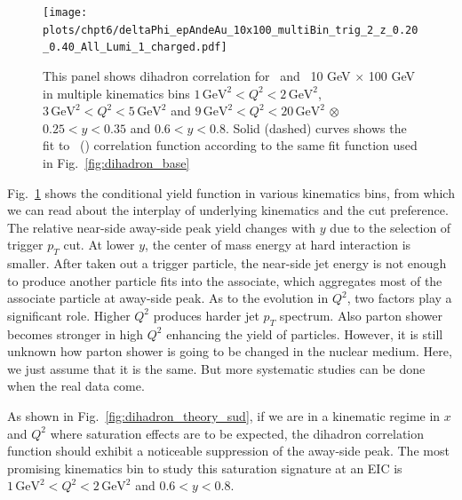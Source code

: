 \begin{figure}
\begin{center}
\texttt{[image: plots/chpt6/deltaPhi\_epAndeAu\_10x100\_multiBin\_trig\_2\_z\_0.20\_0.40\_All\_Lumi\_1\_charged.pdf]}
\end{center} 
\caption[Dihadron correlation function in multiple kinematic bins]{This panel shows dihadron correlation for \ep\ and \eAu\ 10 GeV $\times$ 100 GeV in multiple kinematics bins $1\, \textrm{GeV}^{2}<Q^{2}<2 \, \mathrm{GeV}^{2}$, $3\, \textrm{GeV}^{2}<Q^{2}<5 \,
\mathrm{GeV}^{2}$ and $9\, \textrm{GeV}^{2}<Q^{2}<20 \, \mathrm{GeV}^{2}$ $\otimes $
$0.25<y<0.35$ and $0.6<y<0.8$. Solid (dashed) curves shows the fit to
\ep\ (\eAu) correlation function according to the same fit function used in Fig.~\ref{fig:dihadron_base}}
\label{fig:dihadronMulti} 
\end{figure}

Fig.~\ref{fig:dihadronMulti} shows the conditional yield function in various
kinematics bins, from which we can read about the interplay of
underlying kinematics and the cut preference. The relative near-side away-side
peak yield changes with $y$ due to the selection of trigger $p_{T}$ cut. At
lower $y$, the center of mass energy at hard interaction is smaller. After taken
out a trigger particle, the near-side jet energy is not enough to produce
another particle fits into the associate, which aggregates most of the associate
particle at away-side peak. As to the evolution in $Q^{2}$, two factors play a
significant role. Higher $Q^{2}$ produces harder jet $p_{T}$ spectrum. Also
parton shower becomes stronger in high $Q^{2}$ enhancing the yield of particles.
However, it is still unknown how parton shower is going to be changed in the nuclear
medium. Here, we just assume that it is the same. But more systematic
studies can be done when the real data come.


As shown in Fig.~\ref{fig:dihadron_theory_sud}, if we are in a kinematic regime
in $x$ and $Q^2$ where saturation effects are to be expected, the dihadron
correlation function should exhibit a noticeable suppression of the away-side
peak. The most promising kinematics bin to study this saturation signature at an
EIC is $1\, \textrm{GeV}^{2}<Q^{2}<2 \, \mathrm{GeV}^{2}$ and $0.6<y<0.8$.

